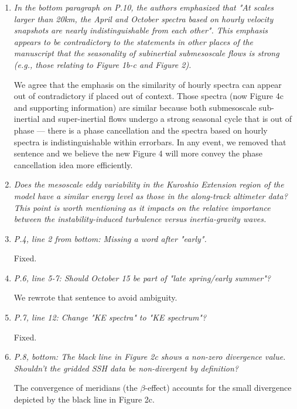 \documentclass[11pt]{article}
\newcommand{\bdp}{\begin{description}}
\newcommand{\edp}{\end{description}}
\begin{document}
\begin{enumerate}


\item {\it In the bottom paragraph on P.10, the authors emphasized that "At scales larger
than 20km, the April and October spectra based on hourly velocity snapshots are
nearly indistinguishable from each other". This emphasis appears to be contradictory
to the statements in other places of the manuscript that the seasonality of subinertial
submesoscale flows is strong (e.g., those relating to Figure 1b-c and Figure 2).}\\

    \bdp
        We agree that the emphasis on the similarity of hourly spectra can appear
        out of contradictory if placed out of context. Those spectra (now Figure 4c
        and supporting information) are similar because both submesoscale sub-inertial
        and super-inertial flows undergo a strong seasonal cycle that is out of
        phase --- there is a phase cancellation and the spectra based on hourly
        spectra is indistinguishable within errorbars. In any event, we removed
        that sentence and we believe the new Figure 4 will more convey
        the phase cancellation idea more efficiently.
    \edp

\item {\it Does the mesoscale eddy variability in the Kuroshio Extension region of the model
have a similar energy level as those in the along-track altimeter data? This point
is worth mentioning as it impacts on the relative importance between the instability-induced
turbulence versus inertia-gravity waves.}

\item {\it P.4, line 2 from bottom: Missing a word after "early".}

  Fixed.

\item {\it P.6, line 5-7: Should October 15 be part of "late spring/early summer"?}

  We rewrote that sentence to avoid ambiguity.

\item {\it P.7, line 12: Change "KE spectra" to "KE spectrum"?}

Fixed.

\item {\it P.8, bottom: The black line in Figure 2c shows a non-zero divergence value.
      Shouldn't the gridded SSH data be non-divergent by definition?}

  \bdp
    The convergence of meridians (the $\beta$-effect) accounts for the
    small divergence depicted by the black line in Figure 2c.
  \edp


\end{enumerate}
\end{document}
